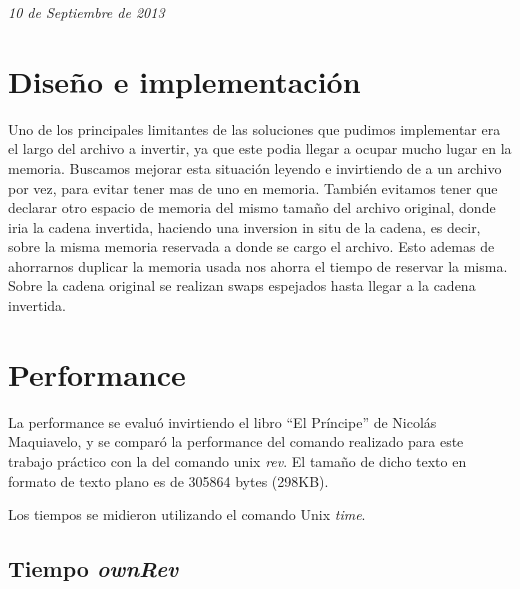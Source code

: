 \documentclass{article}
\begin{document}
\begin{titlepage}

{\large \text \em {10 de Septiembre de 2013}}\\[3cm] %
 

\vfill %

\end{titlepage}

	\tableofcontents
		
\newpage

\section{Diseño e implementación}

Uno de los principales limitantes de las soluciones que pudimos implementar era el largo del archivo a invertir, ya que este podia llegar a ocupar mucho lugar en la memoria. Buscamos mejorar esta situación leyendo e invirtiendo de a un archivo por vez, para evitar tener mas de uno en memoria. También evitamos tener que declarar otro espacio de memoria del mismo tamaño del archivo original, donde iria la cadena invertida, haciendo una inversion in situ de la cadena, es decir, sobre la misma memoria reservada a donde se cargo el archivo. Esto ademas de ahorrarnos duplicar la memoria usada nos ahorra el tiempo de reservar la misma. Sobre la cadena original se realizan swaps espejados hasta llegar a la cadena invertida.

\section{Performance}

La performance se evaluó invirtiendo el libro ``El Príncipe'' de Nicolás Maquiavelo, y se comparó
la performance del comando realizado para este trabajo práctico con la del comando unix \emph{rev}.
El tamaño de dicho texto en formato de texto plano es de 305864 bytes (298KB).

Los tiempos se midieron utilizando el comando Unix \emph{time}.

\subsection{Tiempo \emph{ownRev}}
\end{document}
